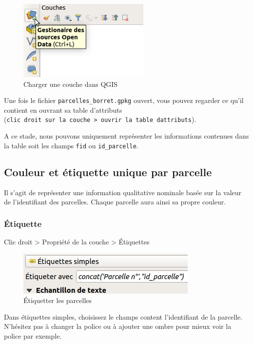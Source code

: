\begin{figure}[htbp]
\centering
\includegraphics[height=1.56250in]{figures/QGIS_charger.png}
\caption{Charger une couche dans QGIS}
\end{figure}

Une fois le fichier \texttt{parcelles\_borret.gpkg} ouvert, vous pouvez
regarder ce qu'il contient en ouvrant sa table d'attributs
(\texttt{clic\ droit\ sur\ la\ couche\ \textgreater{}\ ouvrir\ la\ table\ d\textquotesingle{}attributs}).

A ce stade, nous pouvons uniquement représenter les informations
contenues dans la table soit les champs \texttt{fid} ou
\texttt{id\_parcelle}.

\subsection{Couleur et étiquette unique par
parcelle}\label{couleur-et-uxe9tiquette-unique-par-parcelle}

Il s'agit de représenter une information qualitative nominale basée sur
la valeur de l'identifiant des parcelles. Chaque parcelle aura ainsi sa
propre couleur.

\subsubsection{Étiquette}\label{uxe9tiquette}

Clic droit \textgreater{} Propriété de la couche \textgreater{}
Étiquettes

\begin{figure}[htbp]
\centering
\includegraphics{figures/etiquette_parcelle.png}
\caption{Étiquetter les parcelles}
\end{figure}

Dans étiquettes simples, choisissez le champs content l'identifiant de
la parcelle. N'hésitez pas à changer la police ou à ajouter une ombre
pour mieux voir la police par exemple.

